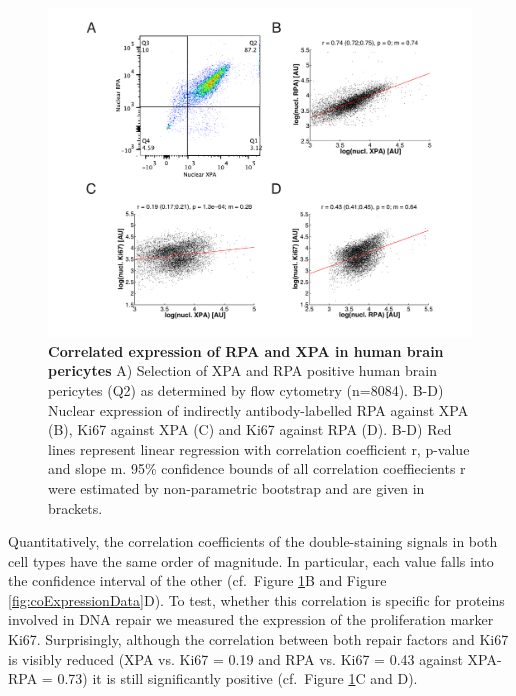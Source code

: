 \begin{figure}[htbp]
	\begin{center}
		\includegraphics[width=1\textwidth]{Abbildungen/figureTAC_3.pdf}
		\caption{\textbf{Correlated expression of RPA and XPA in human brain pericytes} A) Selection of XPA and RPA positive human brain pericytes (Q2) as determined by flow cytometry (n=8084). B-D) Nuclear expression of indirectly antibody-labelled RPA against XPA (B), Ki67 against XPA (C) and Ki67 against RPA (D). B-D) Red lines represent linear regression with correlation coefficient r, p-value and slope m. 95\% confidence bounds of all correlation coeffiecients r were estimated by non-parametric bootstrap and are given in brackets.}
		\label{fig:FC_correlation}
	\end{center}
\end{figure}

Quantitatively, the correlation coefficients of the double-staining signals in both cell types have the same order of magnitude. In particular, each value falls into the confidence interval of the other (cf.\ Figure \ref{fig:FC_correlation}B and Figure \ref{fig:coExpressionData}D). To test, whether this correlation is specific for proteins involved in DNA repair we measured the expression of the proliferation marker Ki67. Surprisingly, although the correlation between both repair factors and Ki67 is visibly reduced (XPA vs. Ki67 = 0.19 and RPA vs. Ki67 = 0.43 against XPA-RPA = 0.73) it is still significantly positive (cf.\ Figure \ref{fig:FC_correlation}C and D).

